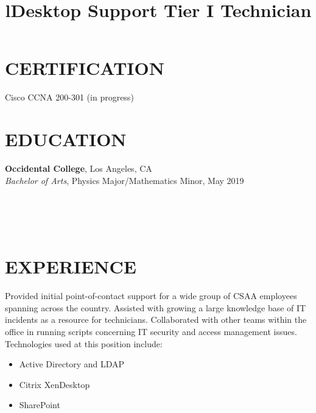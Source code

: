 \documentclass[margin]{res}
\begin{document}
\begin{resume}

	\section{CERTIFICATION}
	Cisco CCNA 200-301 (in progress)


\section{EDUCATION}
\textbf{Occidental College}, Los Angeles, CA\\
{\sl Bachelor of Arts}, Physics Major/Mathematics Minor, May 2019\hfill 


\begin{format}
\title{l}\\
\\
\body\\
\end{format}

\section{EXPERIENCE}
\title{\textbf{Desktop Support Tier I Technician}}
\begin{position}
	Provided initial point-of-contact support for a wide group of CSAA employees spanning across the country. Assisted with growing a large knowledge base of IT incidents as a resource for technicians. Collaborated with other teams within the office in running scripts concerning IT security and access management issues. Technologies used at this position include:
	\begin{itemize}
		\item Active Directory and LDAP
		\item Citrix XenDesktop
		\item SharePoint
	\end{itemize}
\end{position}


\end{resume}
\end{document}
